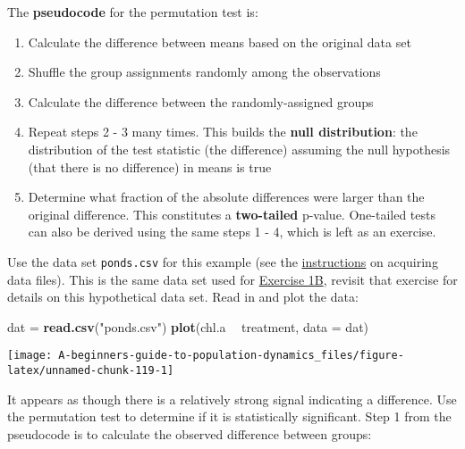 \documentclass[]{book}
\newenvironment{Shaded}{\begin{snugshade}}{\end{snugshade}}
\newcommand{\DataTypeTok}[1]{\textcolor[rgb]{0.13,0.29,0.53}{#1}}
\newcommand{\KeywordTok}[1]{\textcolor[rgb]{0.13,0.29,0.53}{\textbf{#1}}}
\newcommand{\NormalTok}[1]{#1}
\newcommand{\OperatorTok}[1]{\textcolor[rgb]{0.81,0.36,0.00}{\textbf{#1}}}
\newcommand{\StringTok}[1]{\textcolor[rgb]{0.31,0.60,0.02}{#1}}
\providecommand{\tightlist}{%
  \setlength{\itemsep}{0pt}\setlength{\parskip}{0pt}}
\begin{document}
The \textbf{pseudocode} for the permutation test is:

\begin{enumerate}
\def\labelenumi{\arabic{enumi}.}
\tightlist
\item
  Calculate the difference between means based on the original data set
\item
  Shuffle the group assignments randomly among the observations
\item
  Calculate the difference between the randomly-assigned groups
\item
  Repeat steps 2 - 3 many times. This builds the \textbf{null distribution}: the distribution of the test statistic (the difference) assuming the null hypothesis (that there is no difference) in means is true
\item
  Determine what fraction of the absolute differences were larger than the original difference. This constitutes a \textbf{two-tailed} p-value. One-tailed tests can also be derived using the same steps 1 - 4, which is left as an exercise.
\end{enumerate}

Use the data set \texttt{ponds.csv} for this example (see the \protect\hyperlink{data-sets}{instructions} on acquiring data files). This is the same data set used for \protect\hyperlink{ex1b}{Exercise 1B}, revisit that exercise for details on this hypothetical data set. Read in and plot the data:

\begin{Shaded}
\begin{Highlighting}[]
\NormalTok{dat =}\StringTok{ }\KeywordTok{read.csv}\NormalTok{(}\StringTok{"ponds.csv"}\NormalTok{)}
\KeywordTok{plot}\NormalTok{(chl.a }\OperatorTok{~}\StringTok{ }\NormalTok{treatment, }\DataTypeTok{data =}\NormalTok{ dat)}
\end{Highlighting}
\end{Shaded}

\begin{center}\texttt{[image: A-beginners-guide-to-population-dynamics\_files/figure-latex/unnamed-chunk-119-1]} \end{center}

It appears as though there is a relatively strong signal indicating a difference. Use the permutation test to determine if it is statistically significant. Step 1 from the pseudocode is to calculate the observed difference between groups:

\begin{Shaded}
\end{Shaded}
\end{document}
